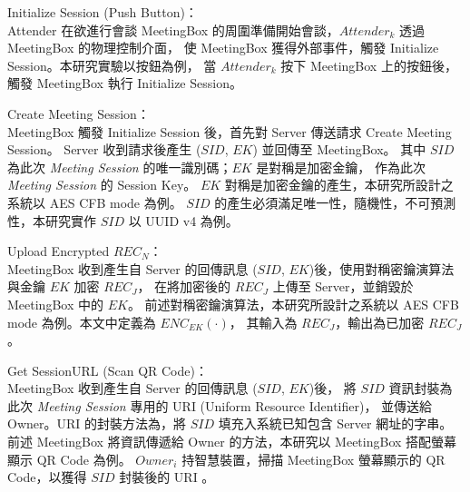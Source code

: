 \begin{steps}
    \item Initialize Session (Push Button)：\\
        Attender 在欲進行會談 MeetingBox 的周圍準備開始會談，$Attender_{k}$ 透過 MeetingBox 的物理控制介面，
        使 MeetingBox 獲得外部事件，觸發 Initialize Session。本研究實驗以按鈕為例，
        當 $Attender_{k}$ 按下 MeetingBox 上的按鈕後，觸發 MeetingBox 執行 Initialize Session。

    \item Create Meeting Session：\\
        MeetingBox 觸發 Initialize Session 後，首先對 Server 傳送請求 Create Meeting Session。
        Server 收到請求後產生 ($SID$, $EK$) 並回傳至 MeetingBox。
        其中 $SID$ 為此次 {\it Meeting Session} 的唯一識別碼；$EK$ 是對稱是加密金鑰，
        作為此次 {\it Meeting Session} 的 Session Key。
        $EK$ 對稱是加密金鑰的產生，本研究所設計之系統以 AES CFB mode 為例。
        $SID$ 的產生必須滿足唯一性，隨機性，不可預測性，本研究實作 $SID$ 以 UUID v4 為例。

    \item Upload Encrypted $REC_{N}$：\\
        MeetingBox 收到產生自 Server 的回傳訊息 ($SID$, $EK$)後，使用對稱密鑰演算法與金鑰 $EK$ 加密 $REC_{J}$，
        在將加密後的 $REC_{J}$ 上傳至 Server，並銷毀於 MeetingBox 中的 $EK$。
        前述對稱密鑰演算法，本研究所設計之系統以 AES CFB mode 為例。本文中定義為 $ENC_{EK}(·)$，
        其輸入為 $REC_{J}$，輸出為已加密 $REC_{J}$。

    \item Get SessionURL (Scan QR Code)：\\
        MeetingBox 收到產生自 Server 的回傳訊息 ($SID$, $EK$)後，
        將 $SID$ 資訊封裝為此次 {\it Meeting Session} 專用的 URI (Uniform Resource Identifier)，
        並傳送給 Owner。URI 的封裝方法為，將 $SID$ 填充入系統已知包含 Server 網址的字串。
        前述 MeetingBox 將資訊傳遞給 Owner 的方法，本研究以 MeetingBox 搭配螢幕顯示 QR Code 為例。
        $Owner_{i}$ 持智慧裝置，掃描 MeetingBox 螢幕顯示的 QR Code，以獲得 $SID$ 封裝後的 URI 。


\end{steps}
